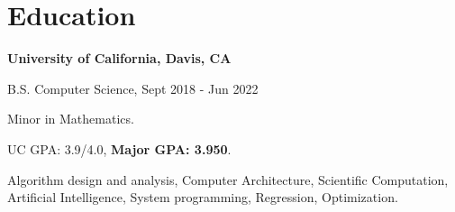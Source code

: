 \section{\sc Education}

{\bf University of California, Davis, CA}\\
\vspace*{-.1in}
\begin{list1}
\item[] B.S. Computer Science, Sept 2018 - Jun 2022
\begin{list2}
\vspace*{.05in}
\item Minor in Mathematics.
\item UC GPA: 3.9/4.0, \textbf{Major GPA: 3.950}.
\item Algorithm design and analysis, Computer Architecture, Scientific Computation, Artificial Intelligence, System programming, Regression, Optimization. 
\end{list2}
\end{list1}


\endinput